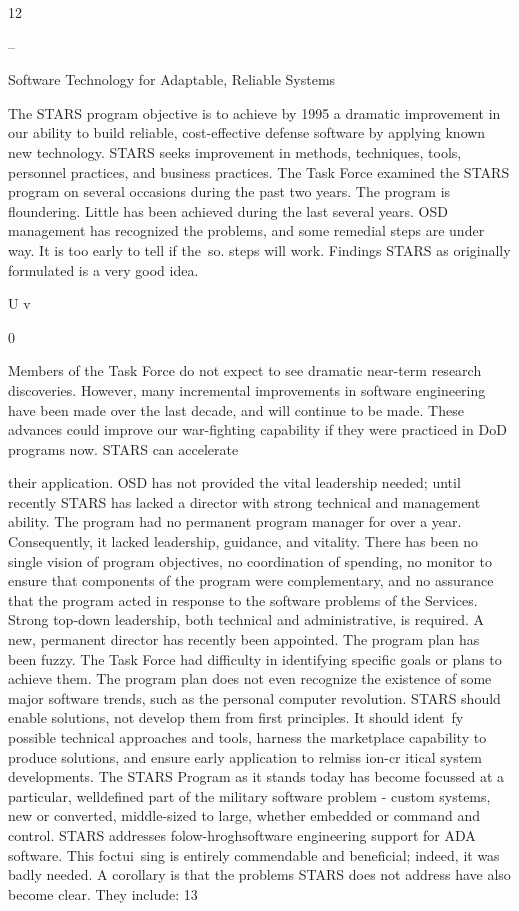 \documentclass[12pt]{article}
\begin{document}
12


--

Software Technology for Adaptable, Reliable Systems

The STARS program objective is to achieve by 1995 a dramatic improvement in our
ability to build reliable, cost-effective defense software by applying known new technology.
STARS seeks improvement in methods, techniques, tools, personnel practices, and business
practices.
The Task Force examined the STARS program on several occasions during the past
two years. The program is floundering. Little has been achieved during the last several
years. OSD management has recognized the problems, and some remedial steps are under
way. It is too early to tell if the~so. steps will work.
Findings
STARS as originally formulated is a very good idea.

U
v

%
0

Members of the Task Force do not expect to see dramatic near-term research discoveries. However, many incremental improvements in software engineering have been made
over the last decade, and will continue to be made. These advances could improve our
war-fighting capability if they were practiced in DoD programs now. STARS can accelerate

their application.
OSD has not provided the vital leadership needed; until recently STARS
has lacked a director with strong technical and management ability.
The program had no permanent program manager for over a year. Consequently, it
lacked leadership, guidance, and vitality. There has been no single vision of program
objectives, no coordination of spending, no monitor to ensure that components of the
program were complementary, and no assurance that the program acted in response to
the software problems of the Services. Strong top-down leadership, both technical and
administrative, is required. A new, permanent director has recently been appointed.
The program plan has been fuzzy.
The Task Force had difficulty in identifying specific goals or plans to achieve them.
The program plan does not even recognize the existence of some major software trends,
such as the personal computer revolution. STARS should enable solutions, not develop
them from first principles. It should ident~fy possible technical approaches and tools,
harness the marketplace capability to produce solutions, and ensure early application to
relmiss ion-cr itical system developments.
The STARS Program as it stands today has become focussed at a particular, welldefined part of the military software problem - custom systems, new or converted,
middle-sized to large, whether embedded or command and control. STARS addresses
folow-hroghsoftware engineering support for ADA software.
This foctui~sing is entirely commendable and beneficial; indeed, it was badly needed.
A corollary is that the problems STARS does not address have also become clear. They
include:
13
\end{document}
